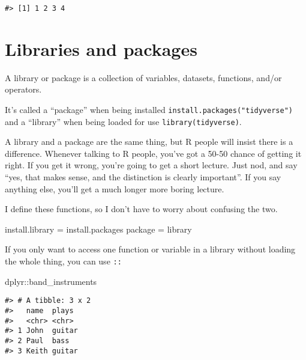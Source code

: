 \documentclass[
]{book}
\newenvironment{Shaded}{\begin{snugshade}}{\end{snugshade}}
\newcommand{\NormalTok}[1]{#1}
\newcommand{\OtherTok}[1]{\textcolor[rgb]{0.56,0.35,0.01}{#1}}
\newcommand{\SpecialCharTok}[1]{\textcolor[rgb]{0.00,0.00,0.00}{#1}}
\begin{document}
\begin{verbatim}
#> [1] 1 2 3 4
\end{verbatim}

\hypertarget{libraries-and-packages}{%
\chapter{Libraries and packages}\label{libraries-and-packages}}

A library or package is a collection of variables, datasets, functions, and/or operators.

It's called a ``package'' when being installed \texttt{install.packages("tidyverse")} and a ``library'' when being loaded for use \texttt{library(tidyverse)}.

A library and a package are the same thing, but R people will insist there is a difference. Whenever talking to R people, you've got a 50-50 chance of getting it right. If you get it wrong, you're going to get a short lecture. Just nod, and say ``yes, that makes sense, and the distinction is clearly important''. If you say anything else, you'll get a much longer more boring lecture.

I define these functions, so I don't have to worry about confusing the two.

\begin{Shaded}
\begin{Highlighting}[]
\NormalTok{install.library }\OtherTok{=}\NormalTok{ install.packages}
\NormalTok{package }\OtherTok{=}\NormalTok{ library}
\end{Highlighting}
\end{Shaded}

If you only want to access one function or variable in a library without loading the whole thing, you can use \texttt{::}

\begin{Shaded}
\begin{Highlighting}[]
\NormalTok{dplyr}\SpecialCharTok{::}\NormalTok{band\_instruments}
\end{Highlighting}
\end{Shaded}

\begin{verbatim}
#> # A tibble: 3 x 2
#>   name  plays 
#>   <chr> <chr> 
#> 1 John  guitar
#> 2 Paul  bass  
#> 3 Keith guitar
\end{verbatim}
\end{document}
